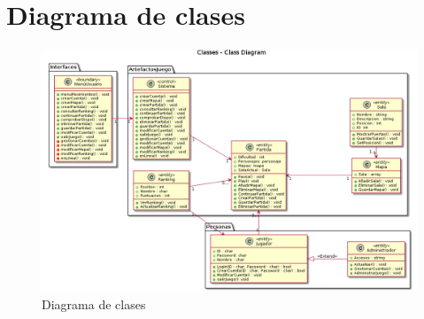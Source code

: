 \section{Diagrama de clases}\label{sec:uc}




  \begin{figure}[ht]
  \centering
  \includegraphics[width=1\textwidth]{./imatges/Diagrama_Clases_v4.png}
  \caption{Diagrama de clases}
  \label{fig:usecase}
   \end{figure}
   